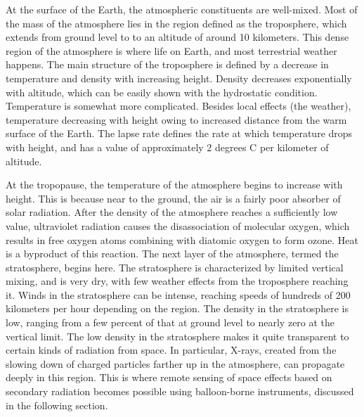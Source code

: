At the surface of the Earth, the atmospheric constituents are well-mixed. Most of the mass of the atmosphere lies in the region defined as the troposphere, which extends from ground level to to an altitude of around 10 kilometers. This dense region of the atmosphere is where life on Earth, and most terrestrial weather happens. The main structure of the troposphere is defined by a decrease in temperature and density with increasing height. Density decreases exponentially with altitude, which can be easily shown with the hydrostatic condition. Temperature is somewhat more complicated. Besides local effects (the weather), temperature decreasing with height owing to increased distance from the warm surface of the Earth. The lapse rate defines the rate at which temperature drops with height, and has a value of approximately 2 degrees C per kilometer of altitude. 

At the tropopause, the temperature of the atmosphere begins to increase with height. This is because near to the ground, the air is a fairly poor absorber of solar radiation. After the density of the atmosphere reaches a sufficiently low value, ultraviolet radiation causes the disassociation of molecular oxygen, which results in free oxygen atoms combining with diatomic oxygen to form ozone. Heat is a byproduct of this reaction. The next layer of the atmosphere, termed the stratosphere, begins here. The stratosphere is characterized by limited vertical mixing, and is very dry, with few weather effects from the troposphere reaching it. Winds in the stratosphere can be intense, reaching speeds of hundreds of 200 kilometers per hour depending on the region. The density in the stratosphere is low, ranging from a few percent of that at ground level to nearly zero at the vertical limit. The low density in the stratosphere makes it quite transparent to certain kinds of radiation from space. In particular, X-rays, created from the slowing down of charged particles farther up in the atmosphere, can propagate deeply in this region. This is where remote sensing of space effects based on secondary radiation becomes possible using balloon-borne instruments, discussed in the following section. 

